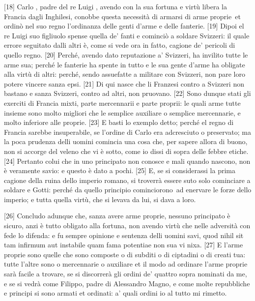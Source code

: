 {[}18{]} Carlo , padre del re Luigi , avendo con la sua fortuna e
virtù libera la Francia dagli Inghilesi, conobbe questa necessità di
armarsi di arme proprie\est\ et ordinò nel suo regno l'ordinanza delle genti
d'arme e delle fanterie. {[}19{]} Dipoi el re Luigi suo figliuolo spense
quella de' fanti e cominciò a soldare Svizzeri: il quale errore
seguitato dalli altri è, come si vede ora in fatto, cagione de' pericoli
di quello regno. {[}20{]} Perché, avendo dato reputazione a' Svizzeri,
ha invilito tutte le arme sua; perché le fanterie ha spente in tutto e
le sua gente d'arme ha obligate alla virtù di altri: perché, sendo
assuefatte a militare con Svizzeri, non pare loro potere vincere sanza
epsi. {[}21{]} Di qui nasce che li Franzesi contro a Svizzeri non
bastano e sanza Svizzeri, contro ad altri, non pruovano. {[}22{]} Sono
dunque stati gli exerciti di Francia mixti, parte mercennarii e parte
proprii: le quali arme tutte insieme sono molto migliori che le semplice
auxiliare o semplice mercennarie, e molto inferiore alle proprie.
{[}23{]} E basti lo exemplo detto; perché el regno di Francia sarebbe
insuperabile, se l'ordine di Carlo era adcresciuto o preservato; ma la
poca prudenza delli uomini comincia una cosa che, per sapere allora di
buono, non si accorge del veleno che vi è sotto, come io dissi di sopra
delle febbre etiche. {[}24{]} Pertanto colui che in uno principato non
conosce e mali quando nascono, non è veramente savio: e questo è dato a
pochi. {[}25{]} E, se si considerassi la prima cagione della ruina dello
imperio romano, si troverrà essere suto solo cominciare a soldare e
Gotti: perché da quello principio cominciorono\est\ ad enervare le forze
dello imperio; e tutta quella virtù, che si levava da lui, si dava a
loro.

{[}26{]} Concludo adunque che, sanza avere arme proprie, nessuno
principato è sicuro, anzi è tutto obligato alla fortuna, non avendo
virtù che nelle adversità con fede lo difenda: e fu sempre opinione e
sentenza delli uomini savi, quod nihil sit tam infirmum aut instabile
quam fama potentiae non sua vi nixa. {[}27{]} E l'arme proprie sono
quelle che sono composte o di subditi o di ciptadini o di creati tua:
tutte l'altre sono o mercennarie o auxiliare et il modo ad ordinare
l'arme proprie sarà facile a trovare, se si discorrerà gli ordini de'
quattro sopra nominati da me, e se si vedrà come Filippo, padre di
Alessandro Magno, e come molte repubbliche e principi si sono armati et
ordinati: a' quali ordini io al tutto mi rimetto.

